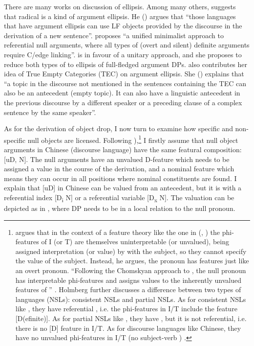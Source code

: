 \documentclass[output=paper]{LSP/langsci}
\begin{document}
There are many works on discussion of ellipsis. Among many others, \citet{Saito2007} suggests that radical  is a kind of argument ellipsis. He (\citeyear[25]{Saito2007}) argues that “those languages that have argument ellipsis can use LF objects provided by the discourse in the derivation of a new sentence”. \citet[269]{Sigurðsson2011Conditions} proposes “a unified minimalist approach to referential null arguments, where all types of (overt and silent) definite arguments require C/edge linking”. \citet{Duguine2014} is in favour of a unitary approach, and she proposes to reduce both types of  to ellipsis of full-fledged argument DPs. \citet{Li2014} also contributes her idea of True Empty Categories (TEC) on argument ellipsis. She (\citeyear[65]{Li2014}) explains that “a topic in the discourse not mentioned in the sentences containing the TEC can also be an antecedent (empty topic). It can also have a linguistic antecedent in the previous discourse by a different speaker or a preceding clause of a complex sentence by the same speaker”.


As for the derivation of object drop, I now turn to examine how specific and non-specific null objects are licensed. Following \citet{Holmberg2005,Holmberg2010Null}),\footnote{\citet{Holmberg2005} argues that in the context of a feature theory like the one in \citeauthor{Chomsky1995} (\citeyear[Ch.~4]{Chomsky1995}, \citeyear{Chomsky2001}) the phi-features of I (or T) are themselves uninterpretable (or unvalued), being assigned interpretation (or value) by  with the subject, so they cannot specify the value of the subject. Instead, he argues, the  pronoun has features just like an overt pronoun. “Following the Chomskyan approach to , the null pronoun has interpretable phi-features and assigns values to the inherently unvalued features of ” \citep[548]{Holmberg2005}. Holmberg further discusses a difference between two types of  languages (NSLs): consistent NSLs and partial NSLs. As for consistent NSLs like , they have referential , i.e. the phi-features in I/T include the feature [D(efinite)]. As for partial NSLs like , they have , but it is not referential, i.e. there is no [D] feature in I/T. As for discourse  languages like Chinese, they have no unvalued phi-features in I/T (no subject-verb ) \citep[559]{Holmberg2005}.} I firstly assume that null object arguments in Chinese (discourse  language) have the same featural composition: [uD, N]. The null arguments have an unvalued D-feature which needs to be assigned a value in the course of the derivation, and a nominal feature which means they can occur in all positions where nominal constituents are found. I explain that [uD] in Chinese can be valued from an antecedent, but it is with a referential index [D\textsubscript{i} N] or a referential variable [D\textsubscript{x} N]. The valuation can be depicted as in , where DP needs to be in a local relation to the null pronoun.
\end{document}
